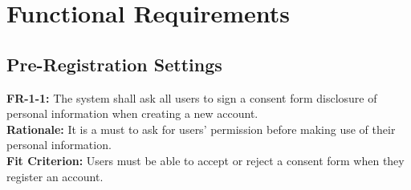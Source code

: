 \documentclass[12pt]{article}
\begin{document}
\section{Functional Requirements}
\subsection{Pre-Registration Settings}
    \textbf{FR-1-1:} The system shall ask all users to sign a consent form disclosure of personal information when creating a new account.\\
    \textbf{Rationale:} It is a must to ask for users' permission before making use of their personal information.\\
    \textbf{Fit Criterion:} Users must be able to accept or reject a consent form when they register an account.\\\\
    
\end{document}
